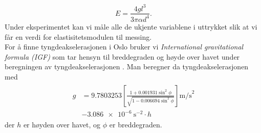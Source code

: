 \documentclass[%
 reprint,
 amsmath,amssymb,
 aps,
 norsk,
 booktabs
]{revtex4-1}
\begin{document}
\begin{equation}
  E = \frac{4gl^3}{3\pi \alpha d^4}. \label{young3}
\end{equation}
Under eksperimentet kan vi måle alle de ukjente variablene i uttrykket slik at vi får en verdi for elastisitetsmodulen til messing.\\
For å finne tyngdeakselerasjonen i Oslo bruker vi \textit{International gravitational formula (IGF)} som tar hensyn til breddegraden og høyde over havet under beregningen av tyngdeakselerasjonen \cite{gravity}. Man beregner da tyngdeakselerasjonen med
\begin{align}
\begin{split}
  g &= 9.7803253\left[\frac{1+0.001931\sin^2{\phi}}{\sqrt{1-0.006694\sin^2{\phi}}}\right]\text{m/s}^2\\
      &- \SI{3.086e-6}{\second^{-2}}\cdot h \label{calc_g}
\end{split}
\end{align}
der $h$ er høyden over havet, og $\phi$ er breddegraden.
\end{document}
